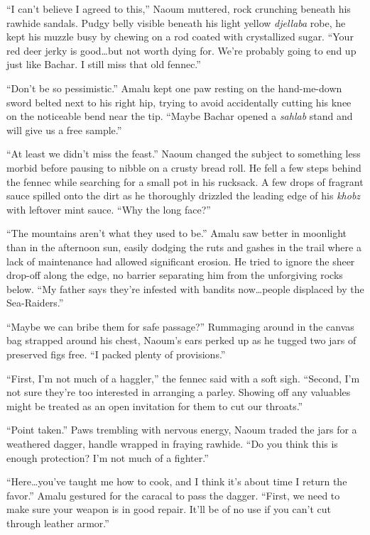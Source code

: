 ``I can't believe I agreed to this,'' Naoum muttered, rock crunching beneath his rawhide sandals. Pudgy belly visible beneath his light yellow \emph{djellaba} robe, he kept his muzzle busy by chewing on a rod coated with crystallized sugar. ``Your red deer jerky is good\ldots{}but not worth dying for. We're probably going to end up just like Bachar. I still miss that old fennec.''

``Don't be so pessimistic.'' Amalu kept one paw resting on the hand-me-down sword belted next to his right hip, trying to avoid accidentally cutting his knee on the noticeable bend near the tip. ``Maybe Bachar opened a \emph{sahlab} stand and will give us a free sample.''

``At least we didn't miss the feast.'' Naoum changed the subject to something less morbid before pausing to nibble on a crusty bread roll. He fell a few steps behind the fennec while searching for a small pot in his rucksack. A few drops of fragrant sauce spilled onto the dirt as he thoroughly drizzled the leading edge of his \emph{khobz} with leftover mint sauce. ``Why the long face?''

``The mountains aren't what they used to be.'' Amalu saw better in moonlight than in the afternoon sun, easily dodging the ruts and gashes in the trail where a lack of maintenance had allowed significant erosion. He tried to ignore the sheer drop-off along the edge, no barrier separating him from the unforgiving rocks below. ``My father says they're infested with bandits now\ldots{}people displaced by the Sea-Raiders.''

``Maybe we can bribe them for safe passage?'' Rummaging around in the canvas bag strapped around his chest, Naoum's ears perked up as he tugged two jars of preserved figs free. ``I packed plenty of provisions.''

``First, I'm not much of a haggler,'' the fennec said with a soft sigh. ``Second, I'm not sure they're too interested in arranging a parley. Showing off any valuables might be treated as an open invitation for them to cut our throats.''

``Point taken.'' Paws trembling with nervous energy, Naoum traded the jars for a weathered dagger, handle wrapped in fraying rawhide. ``Do you think this is enough protection? I'm not much of a fighter.''

``Here\ldots{}you've taught me how to cook, and I think it's about time I return the favor.'' Amalu gestured for the caracal to pass the dagger. ``First, we need to make sure your weapon is in good repair. It'll be of no use if you can't cut through leather armor.''

